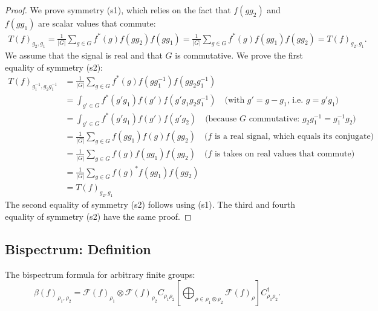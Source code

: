 \documentclass{article}
\begin{document}
\begin{proof}
    We prove symmetry (s1), which relies on the fact that $f(gg_2)$ and $f(gg_1)$ are scalar values that commute:
    \begin{align*}
        T(f)_{g_2, g_1}
            = \frac{1}{|G|} \sum_{g \in G} f^*(g)f(gg_2)f(gg_1)
            = \frac{1}{|G|} \sum_{g \in G} f^*(g)f(gg_1)f(gg_2)
            = T(f)_{g_2, g_1}.
    \end{align*}
    We assume that the signal is real and that $G$ is commutative.
    We prove the first equality of symmetry (s2):
    \begin{align*}
        T(f)_{g^{-1}_1, g_2g^{-1}_1}
            &= \frac{1}{|G|} \sum_{g \in G} f^*(g)f(gg^{-1}_1)f(gg_2g^{-1}_1) \\
            &= \int_{g' \in G} f^*(g'g_1)f(g')f(g'g_1g_2g^{-1}_1)
                \quad \text{(with $g' = g - g_1$, i.e. $g = g'g_1$)} \\
            &= \int_{g' \in G} f^*(g'g_1)f(g')f(g'g_2)
                \quad \text{(because $G$ commutative: $g_2 g^{-1}_1 = g^{-1}_1 g_2$)} \\
            &= \frac{1}{|G|} \sum_{g \in G} f(gg_1)f(g)f(gg_2)
                \quad \text{($f$ is a real signal, which equals its conjugate)}\\
            &= \frac{1}{|G|} \sum_{g \in G} f(g)f(gg_1)f(gg_2)
                \quad \text{($f$ is takes on real values that commute)}\\
            &= \frac{1}{|G|} \sum_{g \in G} f(g)^*f(gg_1)f(gg_2) \\
            &= T(f)_{g_2, g_1}
    \end{align*}
    The second equality of symmetry (s2) follows using (s1).
    The third and fourth equality of symmetry (s2) have the same proof.
\end{proof}

\subsection{Bispectrum: Definition}

The bispectrum formula for arbitrary finite groups:
\begin{equation}
\beta(f)_{\rho_1, \rho_2}
=
\mathcal{F}(f)_{\rho_1} \otimes \mathcal{F}(f)_{\rho_2} C_{{\rho_1} {\rho_2}}
    \left[
    \bigoplus_{\rho \in \rho_1 \otimes \rho_2}
        \mathcal{F}(f)_\rho
    \right] C_{{\rho_1} {\rho_2}}^{\dagger} .
\end{equation}
\end{document}
